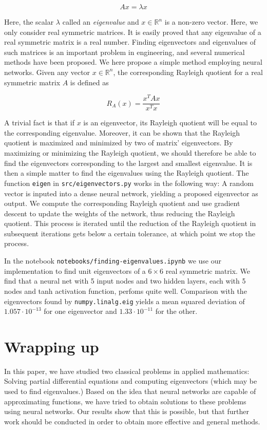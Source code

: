 \documentclass{article}
\begin{document}
\begin{equation}
    Ax = \lambda x
\end{equation}

Here, the scalar $\lambda$ called an \textit{eigenvalue} and $x \in \mathbb{R}^n$ is a non-zero vector. Here, we only consider real symmetric matrices. It is easily proved that any eigenvalue of a real symmetric matrix is a real number. Finding eigenvectors and eigenvalues of such matrices is an important problem in engineering, and several numerical methods have been proposed. We here propose a simple method employing neural networks. Given any vector $x \in \mathbb{R}^n$, the corresponding Rayleigh quotient for a real symmetric matrix $A$ is defined as

\begin{equation}
    R_A(x) = \frac{x^T A x}{x^T x}
\end{equation}

A trivial fact is that if $x$ is an eigenvector, its Rayleigh quotient will be equal to the corresponding eigenvalue. Moreover, it can be shown that the Rayleigh quotient is maximized and minimized by two of matrix' eigenvectors. By maximizing or minimizing the Rayleigh quotient, we should therefore be able to find the eigenvectors corresponding to the largest and smallest eigenvalue. It is then a simple matter to find the eigenvalues using the Rayleigh quotient. The function \texttt{eigen} in \texttt{src/eigenvectors.py} works in the following way: A random vector is inputed into a dense neural network, yielding a proposed eigenvector as output. We compute the corresponding Rayleigh quotient and use gradient descent to update the weights of the network, thus reducing the Rayleigh quotient. This process is iterated until the reduction of the Rayleigh quotient in subsequent iterations gets below a certain tolerance, at which point we stop the process.

In the notebook \texttt{notebooks/finding-eigenvalues.ipynb} we use our implementation to find unit eigenvectors of a $6 \times 6$ real symmetric matrix. We find that a neural net with 5 input nodes and two hidden layers, each with 5 nodes and tanh activation function, perfoms quite well. Comparison with the eigenvectors found by \texttt{numpy.linalg.eig} yields a mean squared deviation of $1.057 \cdot 10^{-13}$ for one eigenvector and $1.33 \cdot10^{-11}$ for the other.

\section{Wrapping up}
In this paper, we have studied two classical problems in applied mathematics: Solving partial differential equations and computing eigenvectors (which may be used to find eigenvalues.) Based on the idea that neural networks are capable of approximating functions, we have tried to obtain solutions to these problems using neural networks. Our results show that this is possible, but that further work should be conducted in order to obtain more effective and general methods.
\end{document}
